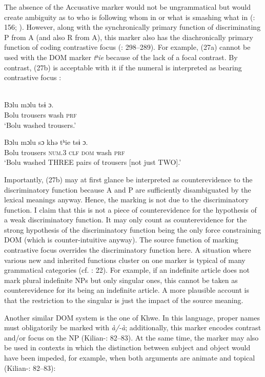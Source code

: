 \documentclass[output=paper]{langsci/langscibook}
\begin{document}
The absence of the Accusative marker would not be ungrammatical but would create ambiguity as to who is following whom in  or what is smashing what in  (\citealt{Matisoff1973}: 156; \citealt{Gerner2008}). However, along with the synchronically primary function of discriminating P from A (and also R from A), this marker also has the diachronically primary function of coding contrastive focus (\citealt{Gerner2008}: 298–289). For example, (27a) cannot be used with the DOM marker \textit{tʰ}\textit{ie} because of the lack of a focal contrast. By contrast, (27b) is acceptable with it if the numeral is interpreted as bearing contrastive focus \citep[299]{Gerner2008}:

\ea\label{ex:serzant:}
\\
\ea
\gll Bɔlu   mɔlu     tsɨ   ɔ.\\
     Bolu  trousers  wash  \textsc{prf}\\
\glt ‘Bolu washed trousers.’

\ex
\gll  Bɔlu   mɔlu     sɔ   khǝ   tʰie   tsɨ   ɔ.\\
     Bolu  trousers  \textsc{num.}3  \textsc{clf}  \textsc{dom}   wash   \textsc{prf}\\
\glt ‘Bolu washed THREE pairs of trousers [not just TWO].’
\z
\z

Importantly, (27b) may at first glance be interpreted as counterevidence to the discriminatory function because A and P are sufficiently disambiguated by the lexical meanings anyway. Hence, the marking is not due to the discriminatory function. I claim that this is not a piece of counterevidence for the hypothesis of a weak discriminatory function. It may only count as counterevidence for the strong hypothesis of the discriminatory function being the only force constraining DOM (which is counter-intuitive anyway). The source function of marking contrastive focus overrides the discriminatory function here. A situation where various new and inherited functions cluster on one marker is typical of many grammatical categories (cf. \citealt{Hopper1991}: 22). For example, if an indefinite article does not mark plural indefinite NPs but only singular ones, this cannot be taken as counterevidence for its being an indefinite article. A more plausible account is that the restriction to the singular is just the impact of the source meaning. 

Another similar DOM system is the one of Khwe. In this language, proper names must obligatorily be marked with \textit{à/-à}; additionally, this marker encodes contrast and/or focus on the NP (Kilian-\citealt{Hatz2006}: 82–83). At the same time, the marker may also be used in contexts in which the distinction between subject and object would have been impeded, for example, when both arguments are animate and topical (Kilian-\citealt{Hatz2006}: 82–83):
\end{document}
